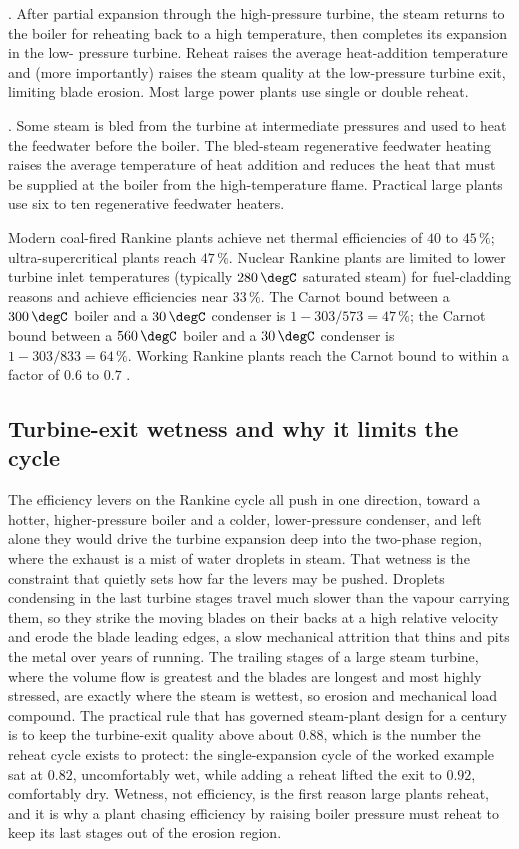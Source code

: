 . After partial expansion through the
high-pressure turbine, the steam returns to the boiler for reheating
back to a high temperature, then completes its expansion in the low-
pressure turbine. Reheat raises the average heat-addition temperature
and (more importantly) raises the steam quality at the low-pressure
turbine exit, limiting blade erosion. Most large power plants use
single or double reheat.

. Some steam is bled from the
turbine at intermediate pressures and used to heat the feedwater
before the boiler. The bled-steam regenerative feedwater heating
raises the average temperature of heat addition and reduces the
heat that must be supplied at the boiler from the high-temperature
flame. Practical large plants use six to ten regenerative
feedwater heaters.

Modern coal-fired Rankine plants achieve net thermal efficiencies of
$40$ to $45\,\%$; ultra-supercritical plants reach $47\,\%$.
Nuclear Rankine plants are limited to lower turbine inlet
temperatures (typically $280\,\degC$ saturated steam) for fuel-cladding
reasons and achieve efficiencies near $33\,\%$. The Carnot bound
between a $300\,\degC$ boiler and a $30\,\degC$ condenser is
$1 - 303/573 = 47\,\%$; the Carnot bound between a $560\,\degC$
boiler and a $30\,\degC$ condenser is $1 - 303/833 = 64\,\%$. Working
Rankine plants reach the Carnot bound to within a factor of $0.6$ to
$0.7$ \cite{text:moran-shapiro-thermo}.

\subsection{Turbine-exit wetness and why it limits the cycle}

The efficiency levers on the Rankine cycle all push in one direction, toward a
hotter, higher-pressure boiler and a colder, lower-pressure condenser, and left
alone they would drive the turbine expansion deep into the two-phase region, where
the exhaust is a mist of water droplets in steam. That wetness is the constraint
that quietly sets how far the levers may be pushed. Droplets condensing in the
last turbine stages travel much slower than the vapour carrying them, so they
strike the moving blades on their backs at a high relative velocity and erode the
blade leading edges, a slow mechanical attrition that thins and pits the metal
over years of running. The trailing stages of a large steam turbine, where the
volume flow is greatest and the blades are longest and most highly stressed, are
exactly where the steam is wettest, so erosion and mechanical load compound. The
practical rule that has governed steam-plant design for a century is to keep the
turbine-exit quality above about $0.88$, which is the number the reheat cycle
exists to protect: the single-expansion cycle of the worked example sat at
$0.82$, uncomfortably wet, while adding a reheat lifted the exit to $0.92$,
comfortably dry. Wetness, not efficiency, is the first reason large plants reheat,
and it is why a plant chasing efficiency by raising boiler pressure must reheat to
keep its last stages out of the erosion region.

